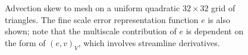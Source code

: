 \documentclass[final,leqno]{siamltex}
\newcommand{\LRp}[1]{\left( #1 \right)}
\begin{document}
\begin{figure}[!h]
\caption{Advection skew to mesh on a uniform quadratic $32\times 32$ grid of triangles.  The fine scale error representation function $e$ is also shown; note that the multiscale contribution of $e$ is dependent on the form of $\LRp{e,v}_V$, which involves streamline derivatives.}
\end{figure}
\end{document}
